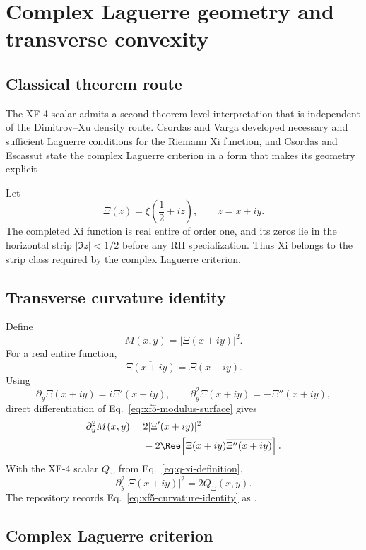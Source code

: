 \chapter{Complex Laguerre geometry and transverse convexity}\label{ch:transverse-convexity}

\section{Classical theorem route}

The XF-4 scalar admits a second theorem-level interpretation that is independent of the Dimitrov--Xu density route.  Csordas and Varga developed necessary and sufficient Laguerre conditions for the Riemann Xi function, and Csordas and Escassut state the complex Laguerre criterion in a form that makes its geometry explicit \cite{CsordasVarga1990,CsordasEscassut2005}.

Let
\[
\Xi(z)=\xi\!\left(\frac12+iz\right),
\qquad z=x+iy.
\]
The completed Xi function is real entire of order one, and its zeros lie in the horizontal strip $|\Im z|<1/2$ before any RH specialization.  Thus Xi belongs to the strip class required by the complex Laguerre criterion.

\section{Transverse curvature identity}

Define
\begin{equation}\label{eq:xf5-modulus-surface}
M(x,y)=|\Xi(x+iy)|^2.
\end{equation}
For a real entire function,
\[
\overline{\Xi(x+iy)}=\Xi(x-iy).
\]
Using
\[
\partial_y\Xi(x+iy)=i\Xi'(x+iy),
\qquad
\partial_y^2\Xi(x+iy)=-\Xi''(x+iy),
\]
direct differentiation of Eq.~\eqref{eq:xf5-modulus-surface} gives
\begin{align}
\partial_y^2M(x,y)
={}&2|\Xi'(x+iy)|^2\\
&-2\Ree\!\left[
\Xi(x+iy)\overline{\Xi''(x+iy)}
\right].
\end{align}
With the XF-4 scalar $Q_\Xi$ from Eq.~\eqref{eq:q-xi-definition},
\begin{equation}\label{eq:xf5-curvature-identity}
\boxed{
\partial_y^2|\Xi(x+iy)|^2=2Q_\Xi(x,y).
}
\end{equation}
The repository records Eq.~\eqref{eq:xf5-curvature-identity} as .

\section{Complex Laguerre criterion}


